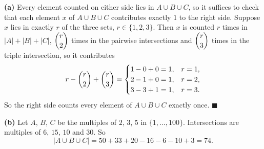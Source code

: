 \textbf{(a)} Every element counted on either side lies in $A\cup B\cup C$, so it suffices to check that each element $x$ of $A\cup B\cup C$ contributes exactly $1$ to the right side. Suppose $x$ lies in exactly $r$ of the three sets, $r\in\{1,2,3\}$. Then $x$ is counted $r$ times in $|A|+|B|+|C|$, $\dbinom r2$ times in the pairwise intersections and $\dbinom r3$ times in the triple intersection, so it contributes
\[r-\dbinom r2+\dbinom r3=\begin{cases}1-0+0=1,&r=1,\\2-1+0=1,&r=2,\\3-3+1=1,&r=3.\end{cases}\]
So the right side counts every element of $A\cup B\cup C$ exactly once. $\blacksquare$

\textbf{(b)} Let $A$, $B$, $C$ be the multiples of $2$, $3$, $5$ in $\{1,\dots,100\}$. Intersections are multiples of $6$, $15$, $10$ and $30$. So
\[|A\cup B\cup C|=50+33+20-16-6-10+3=\boxed{74}.\]
